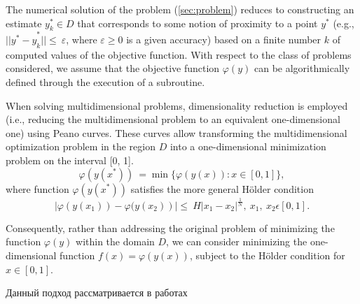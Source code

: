 \documentclass[runningheads]{llncs}
\begin{document}
The numerical solution of the problem (\ref{sec:problem}) reduces to constructing an estimate $y_k^\ast\in D$ that corresponds to some notion of proximity to a point $y^\ast$ (e.g., ${ ||y^\ast-y}_k^\ast||\le\ \varepsilon$, where $\varepsilon\geq0$ is a given accuracy) based on a finite number $k$ of computed values of the objective function. With respect to the class of problems considered, we assume that the objective function $\varphi(y)$ can be algorithmically defined through the execution of a subroutine.

When solving multidimensional problems, dimensionality reduction is employed (i.e., reducing the multidimensional problem to an equivalent one-dimensional one) using Peano curves. These curves allow transforming the multidimensional optimization problem in the region $D$ into a one-dimensional minimization problem on the interval [0, 1].
\begin{displaymath}
	\varphi(y(x^\ast))\ =\min\{\varphi(y(x)): x\in [0,1]\},
\end{displaymath}
where function $\varphi(y(x^\ast))$ satisfies the more general Hölder condition
\begin{displaymath}
	\left|\varphi (y \left(x_1\right))- \varphi (y \left(x_2\right)\right )|\le\ H\left|x_1-x_2\right|^\frac{1}{N},\ x_1,\ x_2\epsilon[0,1].
\end{displaymath} 

Consequently, rather than addressing the original problem of minimizing the function $\varphi(y)$ within the domain $D$, we can consider minimizing the one-dimensional function $f(x)=\varphi(y(x))$, subject to the Hölder condition for $x \in [0, 1]$.


Данный подход рассматривается в работах \cite{Sergeyev2022, Usova2024}

\end{document}
